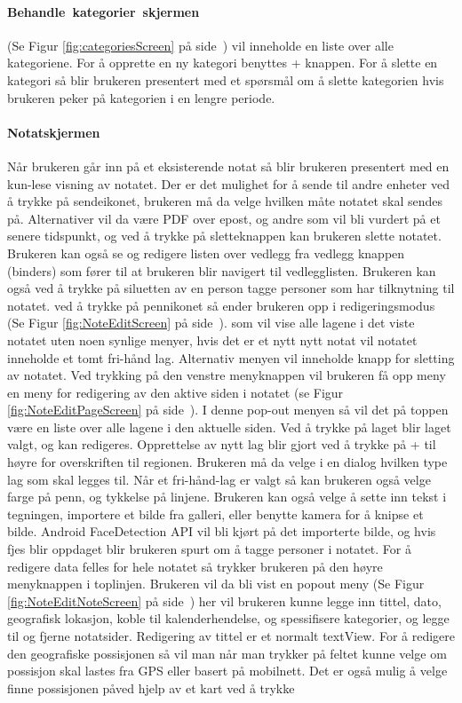 \documentclass[a4paper, 12pt]{article}
\begin{document}
\paragraph{Behandle~kategorier~skjermen}(Se Figur \ref{fig:categoriesScreen} på side~\pageref{fig:categoriesScreen}) vil inneholde en liste over alle kategoriene. For å opprette en ny kategori benyttes + knappen. For å slette en kategori så blir brukeren presentert med et spørsmål om å slette kategorien hvis brukeren peker på kategorien i en lengre periode.

\paragraph{Notatskjermen} Når brukeren går inn på et eksisterende notat så blir brukeren presentert med en kun-lese visning av notatet. Der er det mulighet for å sende til andre enheter ved å trykke på sendeikonet, brukeren må da velge hvilken måte notatet skal sendes på. Alternativer vil da være PDF over epost, og andre som vil bli vurdert på et senere tidspunkt, og ved å trykke på sletteknappen kan brukeren slette notatet. Brukeren kan også se og redigere listen over vedlegg fra vedlegg knappen (binders) som fører til at brukeren blir navigert til vedlegglisten. Brukeren kan også ved å trykke på siluetten av en person tagge personer som har tilknytning til notatet. ved å trykke på pennikonet så ender brukeren opp i redigeringsmodus (Se Figur \ref{fig:NoteEditScreen} på side~\pageref{fig:NoteEditScreen}). som vil vise alle lagene i det viste notatet uten noen synlige menyer, hvis det er et nytt nytt notat vil notatet inneholde et tomt fri-hånd lag. Alternativ menyen vil inneholde knapp for sletting av notatet. Ved trykking på den venstre menyknappen vil brukeren få opp meny en meny for redigering av den aktive siden i notatet (se Figur \ref{fig:NoteEditPageScreen} på side~\pageref{fig:NoteEditPageScreen}). I denne pop-out menyen så vil det på toppen være en liste over alle lagene i den aktuelle siden. Ved å trykke på laget blir laget valgt, og kan redigeres. Opprettelse av nytt lag blir gjort ved å trykke på + til høyre for overskriften til regionen. Brukeren må da velge i en dialog hvilken type lag som skal legges til. Når et fri-hånd-lag er valgt så kan brukeren også velge farge på penn, og tykkelse på linjene. Brukeren kan også velge å sette inn tekst i tegningen, importere et bilde fra galleri, eller benytte kamera for å knipse et bilde. Android FaceDetection API vil bli kjørt på det importerte bilde, og hvis fjes blir oppdaget blir brukeren spurt om å tagge personer i notatet. For å redigere data felles for hele notatet så trykker brukeren på den høyre menyknappen i toplinjen. Brukeren vil da bli vist en popout meny (Se Figur \ref{fig:NoteEditNoteScreen} på side~\pageref{fig:NoteEditNoteScreen}) her vil brukeren kunne legge inn tittel, dato, geografisk lokasjon, koble til kalenderhendelse, og spessifisere kategorier, og legge til og fjerne notatsider. Redigering av tittel er et normalt textView. For å redigere den geografiske possisjonen så vil man når man trykker på feltet kunne velge om possisjon skal lastes fra GPS eller basert på mobilnett. Det er også mulig å velge finne possisjonen påved hjelp av et kart ved å trykke 
\end{document}
